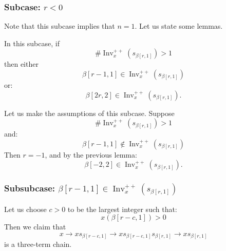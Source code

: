 \documentclass[ALCO,ThmDefs,Unicode]{cedram}
\DeclareMathOperator{\Inv}{Inv}
\newcommand{\Invplusplusx}{\Inv^{++}_x}
\begin{document}
\subsubsection{Subcase: \texorpdfstring{$r < 0$}{r < 0}}

Note that this subcase implies that $n=1$. Let us state some lemmas.

\begin{lemm}
In this subcase, if
\begin{equation}\label{eq:64}
\# \Invplusplusx(s_{\beta[r,1]}) > 1
\end{equation}
then either
\begin{equation}\label{eq:65}
\beta[r-1,1] \in \Invplusplusx(s_{\beta[r,1]})
\end{equation}
or:
\begin{equation}\label{eq:66}
\beta[2r,2] \in \Invplusplusx(s_{\beta[r,1]}).
\end{equation}
\end{lemm}

\begin{lemm}
Let us make the assumptions of this subcase. Suppose
\begin{equation}\label{eq:064}
\# \Invplusplusx(s_{\beta[r,1]}) > 1
\end{equation}
and:
\begin{equation}\label{eq:065}
\beta[r-1,1] \notin \Invplusplusx(s_{\beta[r,1]})
\end{equation}
Then $r = -1$, and by the previous lemma:
\begin{equation}\label{eq:67}
\beta[-2,2] \in \Invplusplusx(s_{\beta[r,1]}).
\end{equation}
\end{lemm}

\subsubsection*{Subsubcase: $\beta[r-1,1] \in \Invplusplusx(s_{\beta[r,1]})$}

Let us choose $c>0$ to be the largest integer such that:
\begin{equation}\label{eq:60}
x(\beta[r-c,1]) > 0
\end{equation}
Then we claim that
\begin{equation}\label{eq:62}
x \rightarrow x s_{\beta[r-c,1]} \rightarrow x s_{\beta[r-c,1]} s_{\beta[r,1]} \rightarrow x s_{\beta[r,1]}
\end{equation}
is a three-term chain.
\end{document}
